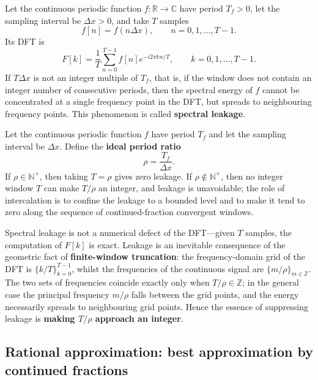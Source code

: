 \begin{definition}\label{def:spectral_leakage_harmonic}
Let the continuous periodic function \(f:\mathbb{R}\to\mathbb{C}\) have period \(T_f>0\), let the sampling interval be \(\Delta x>0\), and take \(T\) samples
\[
f[n]=f(n\Delta x),\qquad n=0,1,\dots,T-1.
\]
Its DFT is
\[
F[k]=\frac{1}{T}\sum_{n=0}^{T-1} f[n]e^{-i2\pi kn/T},\qquad k=0,1,\dots,T-1.
\]
If \(T\Delta x\) is not an integer multiple of \(T_f\), that is, if the window does not contain an integer number of consecutive periods, then the spectral energy of \(f\) cannot be concentrated at a single frequency point in the DFT, but spreads to neighbouring frequency points. This phenomenon is called \textbf{spectral leakage}.
\end{definition}

\begin{definition}\label{def:ideal_period_ratio}
Let the continuous periodic function \(f\) have period \(T_f\) and let the sampling interval be \(\Delta x\). Define the \textbf{ideal period ratio}
\[
\rho=\frac{T_f}{\Delta x}.
\]
If \(\rho\in\mathbb{N}^+\), then taking \(T=\rho\) gives zero leakage. If \(\rho\notin\mathbb{N}^+\), then no integer window \(T\) can make \(T/\rho\) an integer, and leakage is unavoidable; the role of intercalation is to confine the leakage to a bounded level and to make it tend to zero along the sequence of continued-fraction convergent windows.
\end{definition}

\begin{remark}\label{rem:leakage_essence}
Spectral leakage is not a numerical defect of the DFT---given $T$ samples, the computation of $F[k]$ is exact. Leakage is an inevitable consequence of the geometric fact of \textbf{finite-window truncation}: the frequency-domain grid of the DFT is $\{k/T\}_{k=0}^{T-1}$, whilst the frequencies of the continuous signal are $\{m/\rho\}_{m\in\mathbb{Z}}$. The two sets of frequencies coincide exactly only when $T/\rho\in\mathbb{Z}$; in the general case the principal frequency $m/\rho$ falls between the grid points, and the energy necessarily spreads to neighbouring grid points. Hence the essence of suppressing leakage is \textbf{making $T/\rho$ approach an integer}.
\end{remark}

\subsection{Rational approximation: best approximation by continued fractions}

